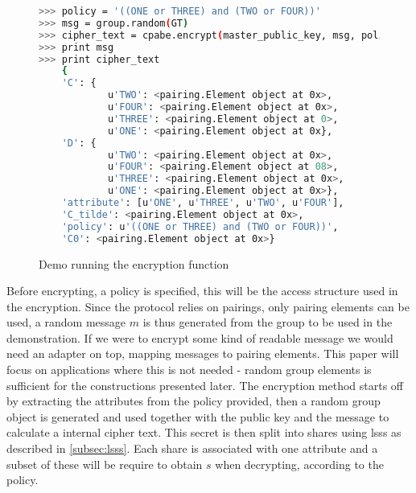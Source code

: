 \begin{figure}[H]
\begin{lstlisting}[language=bash, frame=single, breaklines=true ]
>>> policy = '((ONE or THREE) and (TWO or FOUR))'
>>> msg = group.random(GT)
>>> cipher_text = cpabe.encrypt(master_public_key, msg, policy)
>>> print msg
>>> print cipher_text
    {
    'C': {
            u'TWO': <pairing.Element object at 0x>, 
            u'FOUR': <pairing.Element object at 0x>, 
            u'THREE': <pairing.Element object at 0>, 
            u'ONE': <pairing.Element object at 0x}, 
    'D': {
            u'TWO': <pairing.Element object at 0x>, 
            u'FOUR': <pairing.Element object at 08>, 
            u'THREE': <pairing.Element object at 0x>, 
            u'ONE': <pairing.Element object at 0x>}, 
    'attribute': [u'ONE', u'THREE', u'TWO', u'FOUR'], 
    'C_tilde': <pairing.Element object at 0x>, 
    'policy': u'((ONE or THREE) and (TWO or FOUR))', 
    'C0': <pairing.Element object at 0x>}
\end{lstlisting}  
\caption{Demo running the encryption function}
\label{fig:encfunc} 
\end{figure}


Before encrypting, a policy is specified, this will be the access structure used in the encryption. Since the protocol relies on pairings, only pairing elements can be used, a random message $m$ is thus generated from the group to be used in the demonstration. If we were to encrypt some kind of readable message we would need an adapter on top, mapping messages to pairing elements. This paper will focus on applications where this is not needed - random group elements is sufficient for the constructions presented later. The encryption method starts off by extracting the attributes from the policy provided, then a random group object is generated and used together with the public key and the message to calculate a internal cipher text. This secret is then split into shares using \gls{lsss} as described in \ref{subsec:lsss}. Each share is associated with one attribute and a subset of these will be require to obtain $s$ when decrypting, according to the policy.
 
